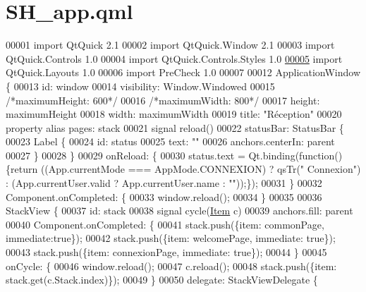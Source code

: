 \hypertarget{SH__app_8qml}{\section{S\-H\-\_\-app.\-qml}
\label{SH__app_8qml}
}

\begin{DoxyCode}
00001 \textcolor{keyword}{import} QtQuick 2.1
00002 import QtQuick.Window 2.1
00003 import QtQuick.Controls 1.0
00004 import QtQuick.Controls.Styles 1.0
\hypertarget{SH__app_8qml_source_l00005}{}\hyperlink{classSH__app}{00005} import QtQuick.Layouts 1.0
00006 import PreCheck 1.0
00007 
00012 ApplicationWindow \{
00013     \textcolor{keywordtype}{id}: window
00014     visibility: Window.Windowed
00015     \textcolor{comment}{/*maximumHeight: 600*/}
00016     \textcolor{comment}{/*maximumWidth: 800*/}
00017     height: maximumHeight
00018     width: maximumWidth
00019     title: \textcolor{stringliteral}{"Réception"}
00020     \textcolor{keyword}{property} alias pages: stack
00021     signal reload()
00022     statusBar: StatusBar \{
00023         Label \{
00024             \textcolor{keywordtype}{id}: status
00025             text: \textcolor{stringliteral}{""}
00026             anchors.centerIn: parent
00027         \}
00028     \}
00029     onReload: \{
00030         status.text = Qt.binding(\textcolor{keyword}{function}() \{\textcolor{keywordflow}{return} ((App.currentMode === AppMode.CONNEXION) ? qsTr(\textcolor{stringliteral}{"
      Connexion"}) : (App.currentUser.valid ? App.currentUser.name : \textcolor{stringliteral}{""}));\});
00031     \}
00032     Component.onCompleted: \{
00033         window.reload();
00034     \}
00035 
00036     StackView \{
00037         \textcolor{keywordtype}{id}: stack
00038         signal cycle(\hyperlink{classItem}{Item} c)
00039         anchors.fill: parent
00040         Component.onCompleted: \{
00041             stack.push(\{item: commonPage, immediate:\textcolor{keyword}{true}\});
00042             stack.push(\{item: welcomePage, immediate: \textcolor{keyword}{true}\});
00043             stack.push(\{item: connexionPage, immediate: \textcolor{keyword}{true}\});
00044         \}
00045         onCycle: \{
00046             window.reload();
00047             c.reload();
00048             stack.push(\{item: stack.get(c.Stack.index)\});
00049         \}
00050         delegate: StackViewDelegate \{

\end{DoxyCode}
